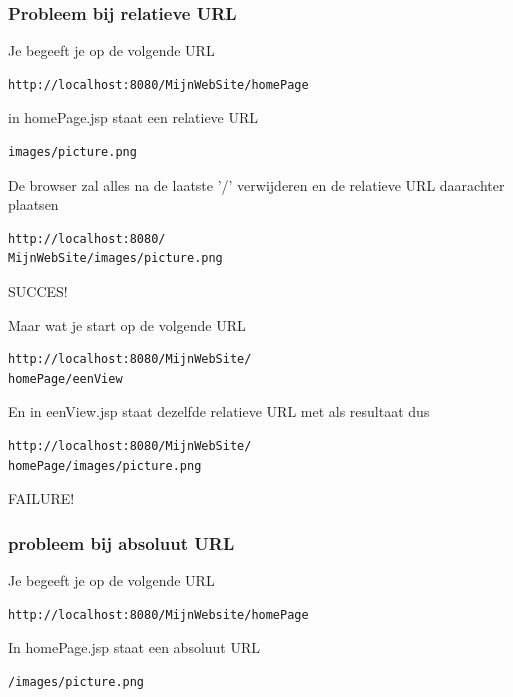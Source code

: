 \documentclass{beamer}
\begin{document}
\begin{frame}[fragile]

\frametitle{Probleem bij relatieve URL}

{\Large 

Je begeeft je op de volgende URL

\begin{verbatim}
http://localhost:8080/MijnWebSite/homePage
\end{verbatim}

in homePage.jsp staat een relatieve URL

\begin{verbatim}
images/picture.png
\end{verbatim}
}

\end{frame}


\begin{frame}[fragile]

{\Large De browser zal alles na de laatste '/' verwijderen en de relatieve URL daarachter plaatsen

\begin{verbatim}
http://localhost:8080/
MijnWebSite/images/picture.png
\end{verbatim}

SUCCES!}

\end{frame}


\begin{frame}[fragile]

{\Large Maar wat je start op de volgende URL

\begin{verbatim}
http://localhost:8080/MijnWebSite/
homePage/eenView
\end{verbatim}

En in eenView.jsp staat dezelfde relatieve URL met als resultaat dus

\begin{verbatim}
http://localhost:8080/MijnWebSite/
homePage/images/picture.png
\end{verbatim}

FAILURE!}

\end{frame}


\begin{frame}[fragile]

\frametitle{probleem bij absoluut URL}

{\Large 

Je begeeft je op de volgende URL

\begin{verbatim}
http://localhost:8080/MijnWebsite/homePage
\end{verbatim}

In homePage.jsp staat een absoluut URL

\begin{verbatim}
/images/picture.png
\end{verbatim}
}

\end{frame}
\end{document}
